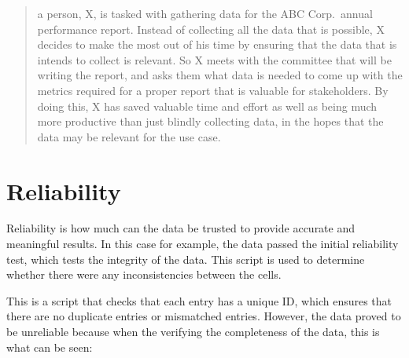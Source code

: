 \documentclass[
]{book}
\newenvironment{Shaded}{\begin{snugshade}}{\end{snugshade}}
\newcommand{\ControlFlowTok}[1]{\textcolor[rgb]{0.13,0.29,0.53}{\textbf{#1}}}
\newcommand{\DecValTok}[1]{\textcolor[rgb]{0.00,0.00,0.81}{#1}}
\newcommand{\KeywordTok}[1]{\textcolor[rgb]{0.13,0.29,0.53}{\textbf{#1}}}
\newcommand{\NormalTok}[1]{#1}
\newcommand{\OperatorTok}[1]{\textcolor[rgb]{0.81,0.36,0.00}{\textbf{#1}}}
\newcommand{\StringTok}[1]{\textcolor[rgb]{0.31,0.60,0.02}{#1}}
\begin{document}
\begin{quote}
a person, X, is tasked with gathering data for the ABC Corp.~annual performance report. Instead of collecting all the data that is possible, X decides to make the most out of his time by ensuring that the data that is intends to collect is relevant. So X meets with the committee that will be writing the report, and asks them what data is needed to come up with the metrics required for a proper report that is valuable for stakeholders. By doing this, X has saved valuable time and effort as well as being much more productive than just blindly collecting data, in the hopes that the data may be relevant for the use case.
\end{quote}

\hypertarget{reliability}{%
\section{Reliability}\label{reliability}}

Reliability is how much can the data be trusted to provide accurate and meaningful results. In this case for example, the data passed the initial reliability test, which tests the integrity of the data. This script is used to determine whether there were any inconsistencies between the cells.

\begin{Shaded}
\end{Shaded}

This is a script that checks that each entry has a unique ID, which ensures that there are no duplicate entries or mismatched entries. However, the data proved to be unreliable because when the verifying the completeness of the data, this is what can be seen:
\end{document}
